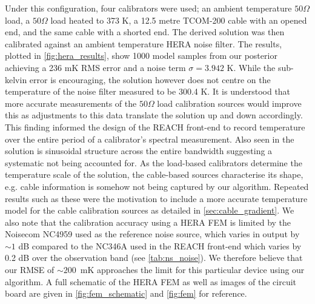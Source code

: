 Under this configuration, four calibrators were used; an ambient temperature $50 \Omega$ load, a $50 \Omega$ load heated to 373 K, a 12.5 metre TCOM-200 cable with an opened end, and the same cable with a shorted end. The derived solution was then calibrated against an ambient temperature HERA noise filter. The results, plotted in \cref{fig:hera_results}, show 1000 model samples from our posterior achieving a 236 mK RMS error and a noise term $\sigma = 3.942$ K. While the sub-kelvin error is encouraging, the solution however does not centre on the temperature of the noise filter measured to be 300.4 K. It is understood that more accurate measurements of the $50 \Omega$ load calibration sources would improve this as adjustments to this data translate the solution up and down accordingly. This finding informed the design of the REACH front-end to record temperature over the entire period of a calibrator’s spectral measurement. Also seen in the solution is sinusoidal structure across the entire bandwidth suggesting a systematic not being accounted for. As the load-based calibrators determine the temperature scale of the solution, the cable-based sources characterise its shape, e.g. cable information is somehow not being captured by our algorithm. Repeated results such as these were the motivation to include a more accurate temperature model for the cable calibration sources as detailed in \cref{sec:cable_gradient}. We also note that the calibration accuracy using a HERA FEM is limited by the Noisecom NC4959 used as the reference noise source, which varies in output by $\sim1$ dB compared to the NC346A used in the REACH front-end which varies by 0.2 dB over the observation band (see \cref{tab:ns_noise}). We therefore believe that our RMSE of \mbox{$\sim200$ mK} approaches the limit for this particular device using our algorithm. A full schematic of the HERA FEM as well as images of the circuit board are given in \cref{fig:fem_schematic} and \cref{fig:fem} for reference.
